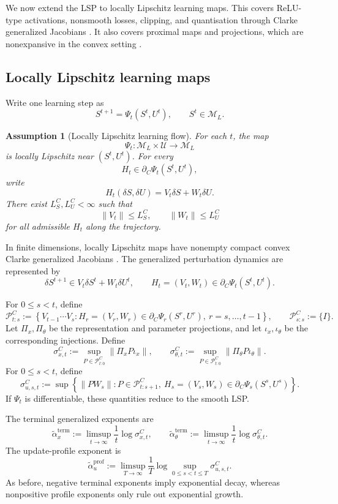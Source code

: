\documentclass{article}
\newtheorem{assumption}{Assumption}
\numberwithin{equation}{section}
\begin{document}
We now extend the LSP to locally Lipschitz learning maps. This covers ReLU-type
activations, nonsmooth losses, clipping, and quantisation through Clarke
generalized Jacobians \cite{Clarke1990Optimization,Clarke1998Nonsmooth}. It also
covers proximal maps and projections, which are nonexpansive in the convex
setting \cite{BauschkeCombettes2011,RockafellarWets1998}.

\subsection{Locally Lipschitz learning maps}
\label{subsec:locally-lipschitz-learning-maps}

Write one learning step as
\[
S^{t+1}=\Psi_t(S^t,U^t),
\qquad
S^t\in\mathcal{M}_L .
\]

\begin{assumption}[Locally Lipschitz learning flow]
\label{ass:LL}
For each \(t\), the map
\[
\Psi_t:\mathcal{M}_L\times\mathcal{U}\to\mathcal{M}_L
\]
is locally Lipschitz near \((S^t,U^t)\). For every
\[
H_t\in\partial_C\Psi_t(S^t,U^t),
\]
write
\[
H_t(\delta S,\delta U)=V_t\delta S+W_t\delta U .
\]
There exist \(L_S^C,L_U^C<\infty\) such that
\[
\|V_t\|\le L_S^C,
\qquad
\|W_t\|\le L_U^C
\]
for all admissible \(H_t\) along the trajectory.
\end{assumption}

In finite dimensions, locally Lipschitz maps have nonempty compact convex
Clarke generalized Jacobians \cite{Clarke1990Optimization}. The generalized
perturbation dynamics are represented by
\[
\delta S^{t+1}\in V_t\delta S^t+W_t\delta U^t,
\qquad
H_t=(V_t,W_t)\in\partial_C\Psi_t(S^t,U^t).
\]

For \(0\le s<t\), define
\[
\mathcal{P}_{t:s}^C
:=
\left\{
V_{t-1}\cdots V_s:
H_r=(V_r,W_r)\in\partial_C\Psi_r(S^r,U^r),
\ r=s,\ldots,t-1
\right\},
\qquad
\mathcal{P}_{s:s}^C:=\{I\}.
\]
Let \(\Pi_x,\Pi_\theta\) be the representation and parameter projections, and
let \(\iota_x,\iota_\theta\) be the corresponding injections. Define
\[
\sigma_{x,t}^C
:=
\sup_{P\in\mathcal{P}_{t:0}^C}
\|\Pi_xP\iota_x\|,
\qquad
\sigma_{\theta,t}^C
:=
\sup_{P\in\mathcal{P}_{t:0}^C}
\|\Pi_\theta P\iota_\theta\|.
\]
For \(0\le s<t\), define
\[
\sigma_{u,s,t}^C
:=
\sup
\left\{
\|PW_s\|:
P\in\mathcal{P}_{t:s+1}^C,\
H_s=(V_s,W_s)\in\partial_C\Psi_s(S^s,U^s)
\right\}.
\]
If \(\Psi_t\) is differentiable, these quantities reduce to the smooth LSP.

The terminal generalized exponents are
\[
\tilde\alpha_x^{\mathrm{term}}
:=
\limsup_{t\to\infty}
\frac1t\log\sigma_{x,t}^C,
\qquad
\tilde\alpha_\theta^{\mathrm{term}}
:=
\limsup_{t\to\infty}
\frac1t\log\sigma_{\theta,t}^C .
\]
The update-profile exponent is
\[
\tilde\alpha_u^{\mathrm{prof}}
:=
\limsup_{T\to\infty}
\frac1T
\log
\sup_{0\le s<t\le T}\sigma_{u,s,t}^C .
\]
As before, negative terminal exponents imply exponential decay, whereas
nonpositive profile exponents only rule out exponential growth.
\end{document}
